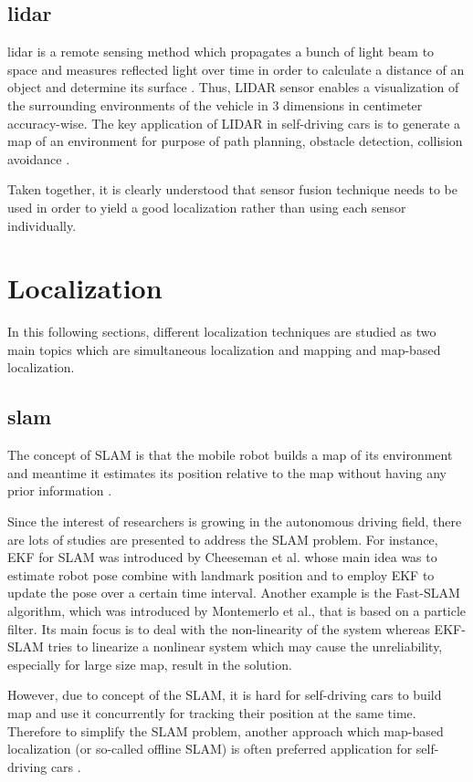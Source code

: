 \subsection*{\acrfull{lidar}}
\acrshort{lidar} is a remote sensing method which propagates a bunch of light beam to space and measures reflected light over time in order to calculate a distance of an object and determine its surface \cite{chp2.6}. Thus, LIDAR sensor enables a visualization of the surrounding environments of the vehicle in 3 dimensions in centimeter accuracy-wise. The key application of LIDAR in self-driving cars is to generate a map of an environment for purpose of path planning, obstacle detection, collision avoidance \cite{6D_SLAM,NDT_SLAM,chp2.4, chp2.5}.
\par Taken together, it is clearly understood that sensor fusion technique needs to be used in order to yield a good localization rather than using each sensor individually.

\section{Localization}
In this following sections, different localization techniques are studied as two main topics which are simultaneous localization and mapping and map-based localization.

\subsection*{\acrfull{slam}}
The concept of SLAM is that the mobile robot builds a map of its environment and meantime it estimates its position relative to the map without having any prior information \cite{slam}. 
\par Since the interest of researchers is growing in the autonomous driving field, there are lots of studies are presented to address the SLAM problem. For instance, EKF for SLAM was introduced by Cheeseman et al.\cite{slam1} whose main idea was to estimate robot pose combine with landmark position and to employ EKF to update the pose over a certain time interval. Another example is the Fast-SLAM algorithm, which was introduced by Montemerlo et al.\cite{slam2}, that is based on a particle filter. Its main focus is to deal with the non-linearity of the system whereas EKF-SLAM tries to linearize a nonlinear system which may cause the unreliability, especially for large size map, result in the solution.
\par However, due to concept of the SLAM, it is hard for self-driving cars to build map and use it concurrently for tracking their position at the same time. Therefore to simplify the SLAM problem, another approach which map-based localization (or so-called offline SLAM) is often preferred application for self-driving cars  \cite{slam3}.

